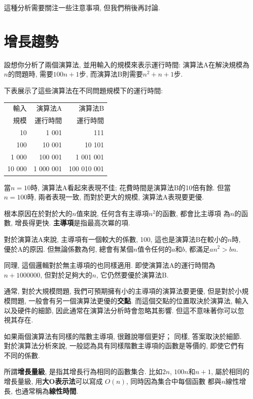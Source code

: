 \documentclass[10pt]{book}
\begin{document}
這種分析需要關注一些注意事項, 但我們稍後再討論. 


\section{增長趨勢}

設想你分析了兩個演算法, 並用輸入的規模來表示運行時間:
演算法A在解決規模為$n$的問題時, 需要$100n+1$步, 而演算法B則需要$n^2 + n + 1$步. 

下表展示了這些演算法在不同問題規模下的運行時間:

\begin{tabular}{|r|r|r|}
\hline
輸入     &  演算法A     & 演算法B \\
規模      &   運行時間     & 運行時間 \\
\hline
10        &   1 001           & 111         \\
100       &   10 001          & 10 101         \\
1 000     &   100 001         & 1 001 001         \\
10 000    &   1 000 001       & 100 010 001         \\
\hline
\end{tabular}

當$n=10$時, 演算法A看起來表現不佳; 花費時間是演算法B的10倍有餘. 
但當$n=100$時, 兩者表現一致, 而對於更大的規模, 演算法A表現要更優. 

根本原因在於對於大的$n$值來說, 任何含有主導項$n^2$的函數, 都會比主導項
為$n$的函數, 增長得更快. 
{\bf 主導項}是指最高次冪的項. 

對於演算法A來說, 主導項有一個較大的係數, 100, 這也是演算法B在較小的$n$時, 
優於A的原因. 但無論係數為何, 
總會有某個$n$值令任何的$a$和$b$, 都滿足$a n^2 > b n$. 

同理, 這個邏輯對於無主導項的也同樣適用. 
即使演算法A的運行時間為$n+1000000$, 但對於足夠大的$n$, 它仍然要優於演算法B. 

通常, 對於大規模問題, 我們可預期擁有小的主導項的演算法要更優, 
但是對於小規模問題, 一般會有另一個演算法更優的{\bf 交點}. 
而這個交點的位置取決於演算法, 輸入以及硬件的細節, 
因此通常在演算法分析時會忽略其影響. 但這不意味著你可以忽視其存在. 

如果兩個演算法有同樣的階數主導項, 很難說哪個更好；
同樣, 答案取決於細節. 
對於演算法分析來說, 一般認為具有同樣階數主導項的函數是等價的, 
即使它們有不同的係數. 

所謂{\bf 增長量級}, 是指其增長行為相同的函數集合. 
比如$2n$, $100n$和$n+1$, 屬於相同的增長量級, 
用{\bf 大O表示法}可以寫成 $O(n)$, 同時因為集合中每個函數
都與$n$線性增長, 也通常稱為{\bf 線性時間}. 
\end{document}
